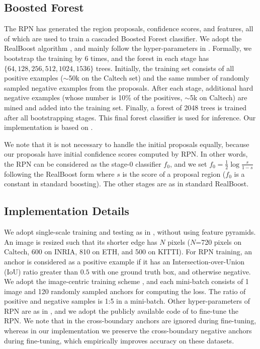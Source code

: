 \documentclass[runningheads]{llncs}
\begin{document}
\subsection{Boosted Forest}

The RPN has generated the region proposals, confidence scores, and features, all of which are used to train a cascaded Boosted Forest classifier. We adopt the RealBoost algorithm \cite{friedman2000additive}, and mainly follow the hyper-parameters in \cite{cai2015learning}.
Formally, we bootstrap the training by 6 times, and the forest in each stage has $\{64, 128, 256, 512, 1024, 1536\}$ trees. Initially, the training set consists of all positive examples ($\sim$50k on the Caltech set) and the same number of randomly sampled negative examples from the proposals. After each stage, additional hard negative examples (whose number is 10\% of the positives, $\sim$5k on Caltech) are mined and added into the training set. Finally, a forest of 2048 trees is trained after all bootstrapping stages. This final forest classifier is used for inference. Our implementation is based on \cite{PMT}.

We note that it is not necessary to handle the initial proposals equally, because our proposals have initial confidence scores computed by RPN. In other words, the RPN can be considered as the stage-0 classifier $f_0$, and we set $f_{0} = \frac{1}{2} \log \frac {s} {1 - s}$ following the RealBoost form where $s$ is the score of a proposal region ($f_0$ is a constant in standard boosting). The other stages are as in standard RealBoost.

\subsection{Implementation Details}

We adopt single-scale training and testing as in \cite{he14ECCV,girshickICCV15fastrcnn,ren2015faster}, without using feature pyramids.
An image is resized such that its shorter edge has $N$ pixels ($N$=720 pixels on Caltech, 600 on INRIA, 810 on ETH, and 500 on KITTI).
For RPN training, an anchor is considered as a positive example if it has an Intersection-over-Union (IoU) ratio greater than $0.5$ with one ground truth box, and otherwise negative. We adopt the image-centric training scheme \cite{girshickICCV15fastrcnn,ren2015faster}, and each mini-batch consists of 1 image and 120 randomly sampled anchors for computing the loss.  The ratio of positive and negative samples is 1:5 in a mini-batch. Other hyper-parameters of RPN are as in \cite{ren2015faster}, and we adopt the publicly available code of \cite{ren2015faster} to fine-tune the RPN. We note that in \cite{ren2015faster} the cross-boundary anchors are ignored during fine-tuning, whereas in our implementation we preserve the cross-boundary negative anchors during fine-tuning, which empirically improves accuracy on these datasets.
\end{document}
